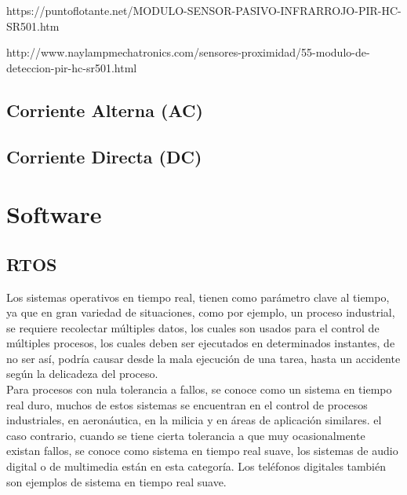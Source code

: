 https://puntoflotante.net/MODULO-SENSOR-PASIVO-INFRARROJO-PIR-HC-SR501.htm

http://www.naylampmechatronics.com/sensores-proximidad/55-modulo-de-deteccion-pir-hc-sr501.html

\subsection{Corriente Alterna (AC)}

\subsection{Corriente Directa (DC)}

\section{Software}

\subsection{RTOS}

\cite{SO} Los sistemas operativos en tiempo real, tienen como parámetro clave al tiempo, ya que en gran variedad de situaciones, como por ejemplo, un proceso industrial, se requiere recolectar múltiples datos, los cuales son usados para el control de múltiples procesos, los cuales deben ser ejecutados en determinados instantes, de no ser así, podría causar desde la mala ejecución de una tarea, hasta un accidente según la delicadeza del proceso.\\ 

Para procesos con nula tolerancia a fallos, se conoce como un sistema en tiempo real duro, muchos de estos sistemas se encuentran en el control de procesos industriales, en aeronáutica, en la milicia y en áreas de aplicación similares. el caso contrario, cuando se tiene cierta tolerancia a que muy ocasionalmente existan fallos, se conoce como sistema en tiempo real suave, los sistemas de audio digital o de multimedia están en esta categoría. Los teléfonos digitales también son ejemplos de sistema en tiempo real suave. \\




